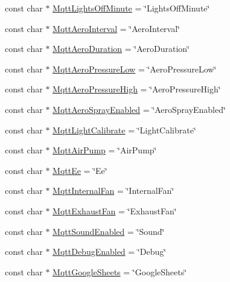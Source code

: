 \begin{DoxyCompactItemize}
\item 
const char $\ast$ \mbox{\hyperlink{_m_q_t_t_8ino_a65bc5e01b994f39c867bfaadd9ce9ac4}{Mqtt\+Lights\+Off\+Minute}} = \char`\"{}Lights\+Off\+Minute\char`\"{}
\item 
const char $\ast$ \mbox{\hyperlink{_m_q_t_t_8ino_ae7516d1ca4ad337f9be7d07b556090e5}{Mqtt\+Aero\+Interval}} = \char`\"{}Aero\+Interval\char`\"{}
\item 
const char $\ast$ \mbox{\hyperlink{_m_q_t_t_8ino_aadecb272d7088d8582f2211588767076}{Mqtt\+Aero\+Duration}} = \char`\"{}Aero\+Duration\char`\"{}
\item 
const char $\ast$ \mbox{\hyperlink{_m_q_t_t_8ino_a4d132761f4a34e3a7994eaa7e83bdae4}{Mqtt\+Aero\+Pressure\+Low}} = \char`\"{}Aero\+Pressure\+Low\char`\"{}
\item 
const char $\ast$ \mbox{\hyperlink{_m_q_t_t_8ino_a16396abfa6768bb5f3d3229649b35cbd}{Mqtt\+Aero\+Pressure\+High}} = \char`\"{}Aero\+Pressure\+High\char`\"{}
\item 
const char $\ast$ \mbox{\hyperlink{_m_q_t_t_8ino_a4f2fb832c7989ffd521a0326b4485c72}{Mqtt\+Aero\+Spray\+Enabled}} = \char`\"{}Aero\+Spray\+Enabled\char`\"{}
\item 
const char $\ast$ \mbox{\hyperlink{_m_q_t_t_8ino_ad41848e095e9dad7c7a19f24a6e8fb35}{Mqtt\+Light\+Calibrate}} = \char`\"{}Light\+Calibrate\char`\"{}
\item 
const char $\ast$ \mbox{\hyperlink{_m_q_t_t_8ino_af19f86a96d76f2d391f24f0c8ae7dde3}{Mqtt\+Air\+Pump}} = \char`\"{}Air\+Pump\char`\"{}
\item 
const char $\ast$ \mbox{\hyperlink{_m_q_t_t_8ino_ac32ae5db7c1567f25f76a9d7dc5ec11b}{Mqtt\+Ee}} = \char`\"{}Ee\char`\"{}
\item 
const char $\ast$ \mbox{\hyperlink{_m_q_t_t_8ino_a52679e76004f891d67309cba0dc9ec44}{Mqtt\+Internal\+Fan}} = \char`\"{}Internal\+Fan\char`\"{}
\item 
const char $\ast$ \mbox{\hyperlink{_m_q_t_t_8ino_a203a63a8683d6b4d289206d50906bc20}{Mqtt\+Exhaust\+Fan}} = \char`\"{}Exhaust\+Fan\char`\"{}
\item 
const char $\ast$ \mbox{\hyperlink{_m_q_t_t_8ino_a621a8dc62df77639fa9a42bcce4f4e64}{Mqtt\+Sound\+Enabled}} = \char`\"{}Sound\char`\"{}
\item 
const char $\ast$ \mbox{\hyperlink{_m_q_t_t_8ino_a9dd527bc8f7b6aa91ec01a19ada280b2}{Mqtt\+Debug\+Enabled}} = \char`\"{}Debug\char`\"{}
\item 
const char $\ast$ \mbox{\hyperlink{_m_q_t_t_8ino_acec4521927a00cc09dab2da8b60c2e95}{Mqtt\+Google\+Sheets}} = \char`\"{}Google\+Sheets\char`\"{}

\end{DoxyCompactItemize}
